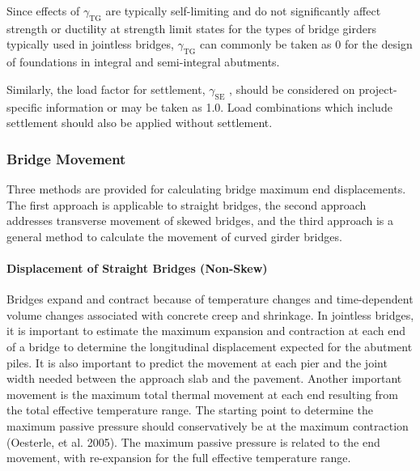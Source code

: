 Since effects of $\gamma_\text{TG}$ are typically self-limiting and do not significantly affect strength or ductility at strength limit
states for the types of bridge girders typically used in jointless bridges, $\gamma_\text{TG}$ can commonly be taken as 0 for the
design of foundations in integral and semi-integral abutments.

Similarly, the load factor for settlement, $\gamma_\text{SE}$ , should be considered on project-specific information or may be
taken as 1.0. Load combinations which include settlement should also be applied without settlement.

\subsubsection{Bridge Movement}
Three methods are provided for calculating bridge maximum end displacements. The first approach is applicable
to straight bridges, the second approach addresses transverse movement of skewed bridges, and the third approach is a
general method to calculate the movement of curved girder bridges.

\paragraph{Displacement of Straight Bridges (Non-Skew)}
Bridges expand and contract because of temperature changes and time-dependent volume changes associated with
concrete creep and shrinkage. In jointless bridges, it is important to estimate the maximum expansion and contraction
at each end of a bridge to determine the longitudinal displacement expected for the abutment piles. It is also
important to predict the movement at each pier and the joint width needed between the approach slab and the
pavement. Another important movement is the maximum total thermal movement at each end resulting from the total
effective temperature range. The starting point to determine the maximum passive pressure should conservatively be
at the maximum contraction (Oesterle, et al. 2005). The maximum passive pressure is related to the end movement,
with re-expansion for the full effective temperature range.

